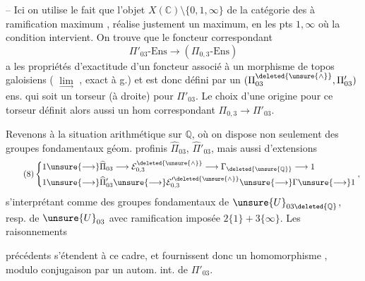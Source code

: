
-- Ici on utilise le fait que l'objet $X(\mathbb C)\setminus\{0,1,\infty\}$ de la catégorie des  à ramification maximum , réalise justement un maximum, en les pts $1,\infty$ où la condition intervient.
On trouve que le foncteur correspondant
\[
\tag{7 bis}
\Pi'_{03}\text{-}\mathrm{Ens}\longrightarrow(\Pi_{0,3}\text{-}\mathrm{Ens})
\]
a les propriétés d'exactitude d'un foncteur associé à un morphisme de topos galoisiens
( $\underset{\longrightarrow}{\lim}$ , exact à g.) et est donc défini par un $(\Pi_{03}^{\deleted{\unsure{\wedge}}},\Pi'_{03})$ ens. qui soit un torseur (à droite) pour $\Pi'_{03}$. Le choix d'une origine pour ce torseur définit alors aussi un hom correspondant $\Pi_{0,3}\longrightarrow\Pi'_{03}$.


Revenons à la situation arithmétique sur $\mathbb Q$, où on dispose non seulement des groupes fondamentaux géom. profinis $\widehat{\Pi}_{03}$, $\widehat{\Pi}'_{03}$, mais aussi d'extensions
\[
\tag{8}
\left\{\begin{aligned}
1&\unsure{\longrightarrow}\widehat{\Pi}_{03}\longrightarrow\mathcal E_{0,3}^{\deleted{\unsure{\wedge}}}\longrightarrow\Gamma_{\deleted{\unsure{\mathbb Q}}}\longrightarrow1\\
1&\unsure{\longrightarrow}\widehat{\Pi}'_{03}\unsure{\longrightarrow}\mathcal E_{0,3}^{\prime\deleted{\unsure{\wedge}}}\unsure{\longrightarrow}\Gamma\unsure{\longrightarrow}1
\end{aligned}\right.,
\]
s'interprétant comme des groupes fondamentaux de $\unsure{U}_{03\deleted{\mathbb Q}}$, resp. de $\unsure{U}_{03}$ avec ramification imposée $2\{1\}+3\{\infty\}$. Les raisonnements


précédents s'étendent à ce cadre, et fournissent donc un homomorphisme  
,
modulo conjugaison par un autom. int. de $\Pi'_{03}$.

